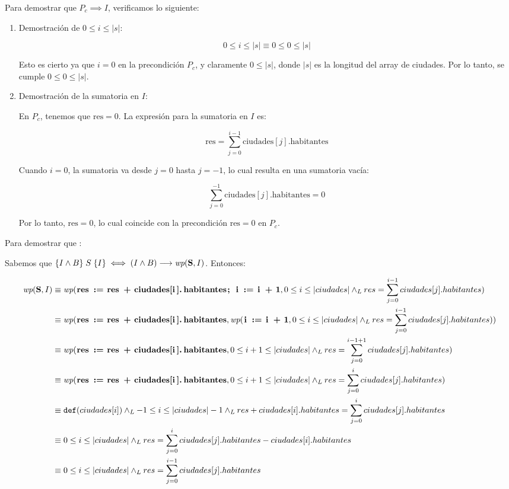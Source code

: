 \documentclass[10pt,a4paper]{article}
\begin{document}
Para demostrar que \( P_c \implies I \), verificamos lo siguiente:

\begin{enumerate}
	\item Demostración de \( 0 \leq i \leq |s| \):

	      \[
		      0 \leq i \leq |s| \equiv 0 \leq 0 \leq |s|
	      \]

	      Esto es cierto ya que \( i = 0 \) en la precondición \( P_c \), y claramente \( 0 \leq |s| \), donde \( |s| \) es la longitud del array de ciudades. Por lo tanto, se cumple \( 0 \leq 0 \leq |s| \).

	\item Demostración de la sumatoria en \( I \):

	      En \( P_c \), tenemos que \( \text{res} = 0 \). La expresión para la sumatoria en \( I \) es:

	      \[
		      \text{res} = \sum_{j=0}^{i-1} \text{ciudades}[j].\text{habitantes}
	      \]

	      Cuando \( i = 0 \), la sumatoria va desde \( j = 0 \) hasta \( j = -1 \), lo cual resulta en una sumatoria vacía:

	      \[
		      \sum_{j=0}^{-1} \text{ciudades}[j].\text{habitantes} = 0
	      \]

	      Por lo tanto, \( \text{res} = 0 \), lo cual coincide con la precondición \( \text{res} = 0 \) en \( P_c \).
\end{enumerate}

Para demostrar que :

Sabemos que $\hoare{I \land B}{S}{I} \iff (I \land B) \implica \wp{S}{I}$. Entonces:

\begin{align*}
	\wp{S}{I} & \equiv  \wp{ res := res + ciudades[i].habitantes; i := i + 1}{0 \leq i \leq |ciudades| \yLuego res = \sum_{j=0}^{i-1} ciudades[j].habitantes}      \\
	          & \equiv  \wp{ res := res + ciudades[i].habitantes}{\wp{i := i + 1}{0 \leq i \leq |ciudades| \yLuego res = \sum_{j=0}^{i-1} ciudades[j].habitantes}} \\
	          & \equiv  \wp{ res := res + ciudades[i].habitantes}{0 \leq i+1 \leq |ciudades| \yLuego res = \sum_{j=0}^{i-1 + 1} ciudades[j].habitantes}            \\
	          & \equiv  \wp{ res := res + ciudades[i].habitantes}{0 \leq i+1 \leq |ciudades| \yLuego res = \sum_{j=0}^{i} ciudades[j].habitantes}                  \\
	          & \equiv  \Def{ciudades[i]} \yLuego -1 \leq i \leq |ciudades| -1 \yLuego res + ciudades[i].habitantes = \sum_{j=0}^{i} ciudades[j].habitantes        \\
	          & \equiv  0 \leq i \leq |ciudades| \yLuego res = \sum_{j=0}^{i} ciudades[j].habitantes - ciudades[i].habitantes                                      \\
	          & \equiv  0 \leq i \leq |ciudades|  \yLuego res = \sum_{j=0}^{i-1} ciudades[j].habitantes
\end{align*}
\end{document}
